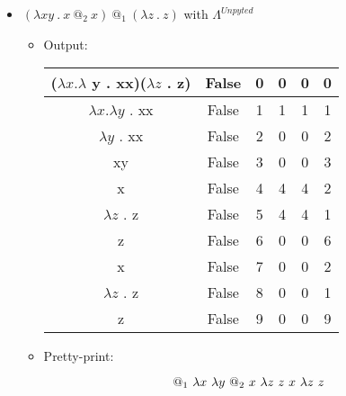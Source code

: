 \documentclass[a4paper, 12pt]{article} %
\newcommand{\tikzmark}[3][]{\tikz[remember picture,baseline] \node [inner xsep=0pt,anchor=base,#1](#2) {#3};}
\begin{document}
\begin{itemize}
\begin{enumerate}
\begin{itemize}
    \end{itemize}
  \end{enumerate}
\item $(\lambda x y\ .\ x\ @_2\ x)\ @_1\ (\lambda z\ .\ z)$ with $\Lambda^{Unpyted}$
  \begin{itemize}
  \item Output:
    \begin{center}
      \begin{tabular}{ c | c | c | c | c | c }
          ($\lambda x . \lambda$ y . xx)($\lambda z$ . z) & False & 0 & 0 & 0 & 0 \\ \hline
          $\lambda x . \lambda y$ . xx                    & False & 1 & 1 & 1 & 1 \\ \hline
          $\lambda y$ . xx                                & False & 2 & 0 & 0 & 2 \\ \hline
          xy                                              & False & 3 & 0 & 0 & 3 \\ \hline
          x                                               & False & 4 & 4 & 4 & 2 \\ \hline
          $\lambda z$ . z                                 & False & 5 & 4 & 4 & 1 \\ \hline
          z                                               & False & 6 & 0 & 0 & 6 \\ \hline
          x                                               & False & 7 & 0 & 0 & 2 \\ \hline
          $\lambda z$ . z                                 & False & 8 & 0 & 0 & 1 \\ \hline
          z                                               & False & 9 & 0 & 0 & 9 \\
      \end{tabular}
    \end{center}
  \item Pretty-print:
    \[\tikzmark{1}{$@_1$}\ \tikzmark{2}{$\lambda x$}\ \tikzmark{3}{$\lambda y$}\ \tikzmark{4}{$@_2$}\ \tikzmark{5}{$x$}\ \tikzmark{6}{$\lambda z$}\ \tikzmark{7}{$z$}\ \tikzmark{8}{$x$}\ \tikzmark{9}{$\lambda z$}\ \tikzmark{10}{$z$}\]
\end{itemize}
\end{itemize}
\end{document}
